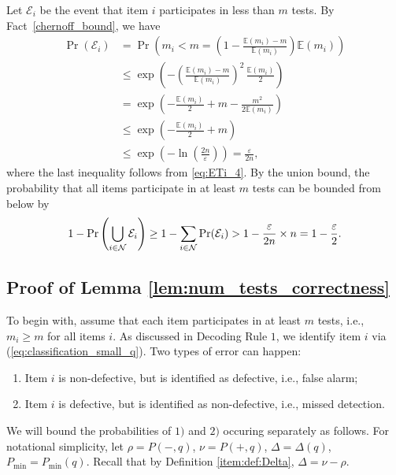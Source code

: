 \documentclass[onecolumn,letterpaper]{IEEEtran}
\newcommand{\cN}{{\cal N}}
\newcommand{\cp}{{q}}
\newcommand{\nt}{{m}}
\newcommand{\nti}{{\nt_{i}}}
\newcommand{\pn}{{P(-,\cp)}}
\newcommand{\pp}{{P(+,\cp)}}
\newcommand{\pmin}{{P_{\min}(\cp)}}
\newcommand{\pgap}{{\Delta(\cp)}}
\newcommand{\spn}{{\rho}}
\newcommand{\spp}{{\nu}}
\newcommand{\spmin}{{P_{\min}}}
\newcommand{\spgap}{{\Delta}}
\begin{document}
Let $\mathcal{E}_i$ be the event that item $i$ participates in less than $\nt$ tests. By Fact~\ref{chernoff_bound}, we have
\begin{equation*}
    \begin{aligned}
    \Pr (\mathcal{E}_i)&= \Pr \left(\nti < \nt = \left( 1 - \frac{ \mathbb{E}(\nti)-\nt}{ \mathbb{E}(\nti)} \right)  \mathbb{E}(\nti) \right) \\
    &\leq \exp \left( - \left( \frac{ \mathbb{E}(\nti)-\nt}{ \mathbb{E}(\nti)} \right)^2 \, \frac{ \mathbb{E}(\nti)}{2} \right) \\
    &= \exp \left( - \frac{ \mathbb{E}(\nti)}{2} + \nt - \frac{\nt^2}{2 \mathbb{E}(\nti)} \right) \\
    &\leq \exp \left( -\frac{ \mathbb{E}(\nti)}{2} + \nt \right) \\
    &\leq \exp \left( -\ln \left( \frac{2n}{\varepsilon} \right) \right)
    = \frac{\varepsilon}{2n},
    \end{aligned} 
\end{equation*}
where the last inequality follows from \eqref{eq:ETi_4}.
By the union bound, the probability that all items participate in at least $\nt$ tests can be bounded from below by
\begin{equation*}
    1 - \Pr\left( \bigcup\limits_{i\in\cN}\mathcal{E}_i \right) \ge 1 - \sum\limits_{i\in\cN} \Pr(\mathcal{E}_i) > 1 - \frac{\varepsilon}{2n} \times n = 1 - \frac{\varepsilon}{2}.
\end{equation*}

\subsection{Proof of Lemma \ref{lem:num_tests_correctness}}
\label{sec:num_tests_correctness}
To begin with, assume that each item participates in at least $\nt$ tests, i.e., $\nti \ge \nt$ for all items $i$. As discussed in Decoding Rule $1$, we identify item $i$ via (\ref{eq:classification_small_q}). Two types of error can happen:
\begin{enumerate}
\item Item $i$ is non-defective, but is identified as defective, i.e., false alarm;
\item Item $i$ is defective, but is identified as non-defective, i.e., missed detection.
\end{enumerate}
We will bound the probabilities of $1)$ and $2)$ occuring separately as follows. For notational simplicity, let $\spn = \pn$, $\spp = \pp$, $\spgap = \pgap$, $\spmin = \pmin$. Recall that by Definition \ref{item:def:Delta}, $\spgap=\spp-\spn$. %
\end{document}
